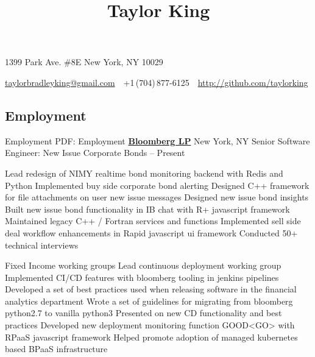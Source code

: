 \documentclass[a4paper,10pt,oneside]{article}
\begin{document}

\title{Taylor King}

\begin{subtitle}
1399 Park Ave. \#8E New York, NY 10029
\par
\href{mailto:taylorbradleyking@gmail.com}
{taylorbradleyking@gmail.com}
\,\BulletSymbol\,
+1\,(704)\,877-6125
\,\BulletSymbol\,
\href{http://github.com/taylorking}
{http://github.com/taylorking}
\end{subtitle}

\begin{body}


\section
{Employment}
{Employment} 
{PDF: Employment} 
\textbf{\href{http://bloomberg.com}{Bloomberg LP}} New York, NY
\newline Senior Software Engineer: New Issue Corporate Bonds\hfill{} -- Present
\begin{detail}
\BulletItem Lead redesign of NIMY realtime bond monitoring backend with Redis and Python
\BulletItem Implemented buy side corporate bond alerting 
\BulletItem Designed C++ framework for file attachments on user new issue messages 
\BulletItem Designed new issue bond insights
\BulletItem Built new issue bond functionality in IB chat with R+ javascript framework
\BulletItem Maintained legacy C++ / Fortran services and functions 
\BulletItem Implemented sell side deal workflow enhancements in Rapid javascript ui framework
\BulletItem Conducted 50+ technical interviews
\end{detail}
\SmallEntryGap
\begin{detail}
Fixed Income working groups
\BulletItem Lead continuous deployment working group
\BulletItem Implemented CI/CD features with bloomberg tooling in jenkins pipelines
\BulletItem Developed a set of best practices used when releasing software in the financial analytics department
\BulletItem Wrote a set of guidelines for migrating from bloomberg python2.7 to vanilla python3
\BulletItem Presented on new CD functionality and best practices
\BulletItem Developed new deployment monitoring function GOOD<GO> with RPaaS javascript framework
\BulletItem Helped promote adoption of managed kubernetes based BPaaS infrastructure
\end{detail}



\end{body}
\end{document}
